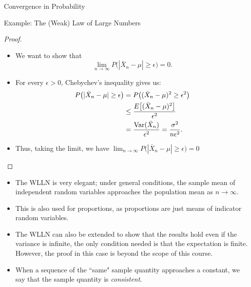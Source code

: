 \begin{frame}[allowframebreaks]{Convergence in Probability}
\begin{block}{Example: The (Weak) Law of Large Numbers}
{\begin{proof}
      \begin{itemize}
        \item We want to show that 
        $$\lim_{n \rightarrow \infty} P\big(|\bar{X}_n - \mu| \geq \epsilon \big) = 0.$$ 
        \item For every $\epsilon > 0$, Chebychev's inequality gives us:
        \begin{align*}
        P\big(|\bar{X}_n - \mu| \geq \epsilon \big) &= P\big((\bar{X}_n - \mu)^2 \geq \epsilon^2\big) \\
        &\leq \frac{E\big[(\bar{X}_n - \mu)^2\big]}{\epsilon^2} \\
        &= \frac{\mathrm{Var}(\bar{X}_n)}{\epsilon^2} = \frac{\sigma^2}{n\epsilon^2}.
        \end{align*}
        \item Thus, taking the limit, we have $\lim_{n \rightarrow \infty} P\big(|\bar{X}_n - \mu| \geq \epsilon \big) = 0$
      \end{itemize}
    \end{proof}
    }
    
  \end{block}
  
  
  \framebreak
  
  \begin{itemize}
    \item The WLLN is very elegant; under general conditions, the sample mean of independent random variables approaches the population mean as $n \rightarrow \infty$.
    \item This is also used for proportions, as proportions are just means of indicator random variables.
    \item The WLLN can also be extended to show that the results hold even if the variance is infinite, the only condition needed is that the expectation is finite. However, the proof in this case is beyond the scope of this course.
    \item When a sequence of the ``same" sample quantity approaches a constant, we say that the sample quantity is \emph{consistent}.
  \end{itemize}
  
  \framebreak
  

\end{frame}
